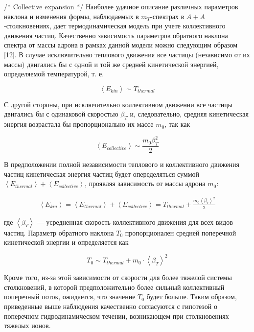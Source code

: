 
/* Collective expansion */
Наиболее удачное описание различных параметров наклона и изменения формы, наблюдаемых в $m_T$-спектрах в $A+A$-столкновениях, дает термодинамическая модель при учете коллективного движения частиц. %
Качественно зависимость параметров обратного наклона спектра от массы адрона в рамках данной модели можно следующим образом [12]. В случае исключительно теплового движения все частицы (независимо от их массы) двигались бы с одной и той же средней кинетической энергией, определяемой температурой, т. е.

\begin{equation}
	\left< E_{kin} \right>  \sim T_{thermal} 
\end{equation}

С другой стороны, при исключительно коллективном движении все частицы двигались бы с одинаковой скоростью $\beta_T$ и, следовательно, средняя кинетическая энергия возрастала бы пропорционально их массе $m_0$, так как

\begin{equation}
	\left< E_{collective} \right>  \sim \frac{m_0\beta_T^2}{2}
\end{equation}

В предположении полной независимости теплового и коллективного движения частиц кинетическая энергия частиц будет опеределяться суммой $\left< E_{thermal} \right> + \left< E_{collective} \right>$, проявляя зависимость от массы адрона $m_0$:

\begin{equation}
	\begin{split}
		\left< E_{kin} \right> = \left< E_{thermal} \right> + \left< E_{collective} \right> = T_{thermal} + \frac{m_0 \left< \beta_T \right>^2}{2} 
	\end{split}
\end{equation}

где $\left< \beta_T \right>$ — усредненная скорость коллективного движения для всех видов частиц. Параметр обратного наклона $T_0$ пропорционален средней поперечной кинетической энергии и определяется как

\begin{equation}
	T_0 \sim T_{thermal} + m_0 \cdot \left< \beta_T \right>^2
\end{equation}


Кроме того, из-за этой зависимости от скорости для более тяжелой системы столкновений, в которой предположительно более сильный коллективный поперечный поток, ожидается, что значение $T_0$ будет больше. Таким образом, приведенные выше наблюдения качественно согласуются с гипотезой о поперечном гидродинамическом течении, возникающем при столкновениях тяжелых ионов.


